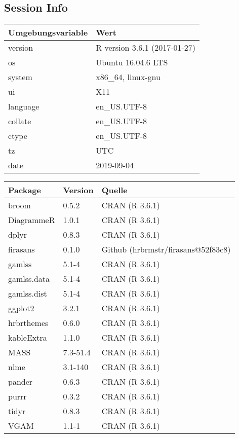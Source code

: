 \documentclass[ngerman,a4paper,]{scrartcl}
\theoremstyle{definition}
\theoremstyle{definition}
\theoremstyle{definition}
\theoremstyle{remark}
\begin{document}
\hypertarget{session-info}{%
\subsection{Session Info}\label{session-info}}

\begin{table}[H]
\centering
\begin{tabular}{ll}
\toprule
Umgebungsvariable & Wert\\
\midrule
version & R version 3.6.1 (2017-01-27)\\
os & Ubuntu 16.04.6 LTS\\
system & x86\_64, linux-gnu\\
ui & X11\\
language & en\_US.UTF-8\\
collate & en\_US.UTF-8\\
ctype & en\_US.UTF-8\\
tz & UTC\\
date & 2019-09-04\\
\bottomrule
\end{tabular}
\end{table}

\begin{table}[H]
\centering
\begin{tabular}{lll}
\toprule
Package & Version & Quelle\\
\midrule
broom & 0.5.2 & CRAN (R 3.6.1)\\
DiagrammeR & 1.0.1 & CRAN (R 3.6.1)\\
dplyr & 0.8.3 & CRAN (R 3.6.1)\\
firasans & 0.1.0 & Github (hrbrmstr/firasans@52f83c8)\\
gamlss & 5.1-4 & CRAN (R 3.6.1)\\
gamlss.data & 5.1-4 & CRAN (R 3.6.1)\\
gamlss.dist & 5.1-4 & CRAN (R 3.6.1)\\
ggplot2 & 3.2.1 & CRAN (R 3.6.1)\\
hrbrthemes & 0.6.0 & CRAN (R 3.6.1)\\
kableExtra & 1.1.0 & CRAN (R 3.6.1)\\
MASS & 7.3-51.4 & CRAN (R 3.6.1)\\
nlme & 3.1-140 & CRAN (R 3.6.1)\\
pander & 0.6.3 & CRAN (R 3.6.1)\\
purrr & 0.3.2 & CRAN (R 3.6.1)\\
tidyr & 0.8.3 & CRAN (R 3.6.1)\\
VGAM & 1.1-1 & CRAN (R 3.6.1)\\
\bottomrule
\end{tabular}
\end{table}
\end{document}
